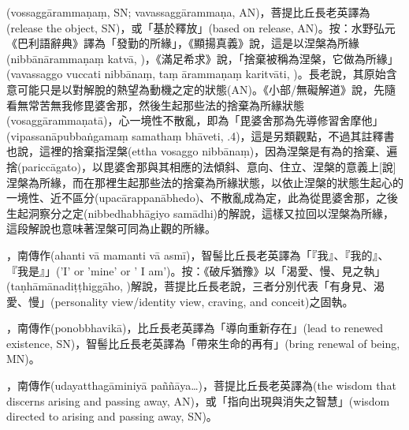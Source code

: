 \startitemgroup[noteitems]
\item{}(vossaggārammaṇaṃ, SN; vavassaggārammaṇa, AN)，菩提比丘長老英譯為(release the object, SN)，或「基於釋放」(based on release, AN)。按：水野弘元《巴利語辭典》譯為「發勤的所緣」，《顯揚真義》說，這是以涅槃為所緣(nibbānārammaṇaṃ katvā, )，《滿足希求》說，「捨棄被稱為涅槃，它做為所緣」(vavassaggo vuccati nibbānaṃ, taṃ ārammaṇaṃ karitvāti, )。長老說，其原始含意可能只是以對解脫的熱望為動機之定的狀態(AN)。《小部/無礙解道》說，先隨看無常苦無我修毘婆舍那，然後生起那些法的捨棄為所緣狀態(vosaggārammaṇatā)，心一境性不散亂，即為「毘婆舍那為先導修習舍摩他」(vipassanāpubbaṅgamaṃ samathaṃ bhāveti, .4)，這是另類觀點，不過其註釋書也說，這裡的捨棄指涅槃(ettha vosaggo nibbānaṃ)，因為涅槃是有為的捨棄、遍捨(pariccāgato)，以毘婆舍那與其相應的法傾斜、意向、住立、涅槃的意義上[說]涅槃為所緣，而在那裡生起那些法的捨棄為所緣狀態，以依止涅槃的狀態生起心的一境性、近不區分(upacārappanābhedo)、不散亂成為定，此為從毘婆舍那，之後生起洞察分之定(nibbedhabhāgiyo samādhi)的解說，這樣又拉回以涅槃為所緣，這段解說也意味著涅槃可同為止觀的所緣。
\stopitemgroup

\startitemgroup[noteitems]
\item{}，南傳作(ahanti vā mamanti vā asmī)，智髻比丘長老英譯為「『我』、『我的』、『我是』」('I' or 'mine' or ' I am')。按：《破斥猶豫》以「渴愛、慢、見之執」(taṇhāmānadiṭṭhiggāho, )解說，菩提比丘長老說，三者分別代表「有身見、渴愛、慢」(personality view/identity view, craving, and conceit)之固執。
\stopitemgroup

\startitemgroup[noteitems]
\item{}，南傳作(ponobbhavikā)，比丘長老英譯為「導向重新存在」(lead to renewed existence, SN)，智髻比丘長老英譯為「帶來生命的再有」(bring renewal of being, MN)。
\stopitemgroup

\startitemgroup[noteitems]
\item{}，南傳作(udayatthagāminiyā paññāya…)，菩提比丘長老英譯為(the wisdom that discerns arising and passing away, AN)，或「指向出現與消失之智慧」(wisdom directed to arising and passing away, SN)。
\stopitemgroup

